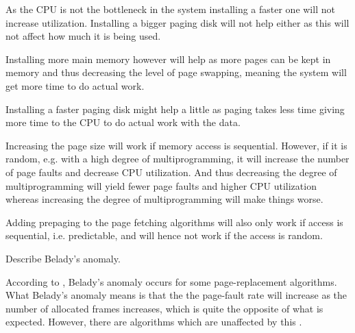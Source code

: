 \documentclass[a4paper]{miunasgn}
\theoremstyle{definition}
\begin{document}
\begin{questions}
\begin{solution}
		As the CPU is not the bottleneck in the system installing a faster one will 
		not increase utilization.
		Installing a bigger paging disk will not help either as this will not 
		affect how much it is being used.
		
		Installing more main memory however will help as more pages can be kept in 
		memory and thus decreasing the level of page swapping, meaning the system 
		will get more time to do actual work.

		Installing a faster paging disk might help a little as paging takes less 
		time giving more time to the CPU to do actual work with the data.

		Increasing the page size will work if memory access is sequential.
		However, if it is random, e.g. with a high degree of multiprogramming, it 
		will increase the number of page faults and decrease CPU utilization.
		And thus decreasing the degree of multiprogramming will yield fewer page 
		faults and higher CPU utilization whereas increasing the degree of 
		multiprogramming will make things worse.

		Adding prepaging to the page fetching algorithms will also only work if 
		access is sequential, i.e. predictable, and will hence not work if the 
		access is random.
	\end{solution}

	\question\label{q:belady}
	Describe Belady's anomaly.
	\begin{solution}
		According to \citet[p. 374]{Silberschatz2009osc}, Belady's anomaly occurs 
		for some page-replacement algorithms.
		What Belady's anomaly means is that the the page-fault rate will increase 
		as the number of allocated frames increases, which is quite the opposite of 
		what is expected.
		However, there are algorithms which are unaffected by this \citep[e.g. OPT, 
		section 9.4.3]{Silberschatz2009osc}.
	\end{solution}
\end{questions}





\printbibliography
\end{document}

